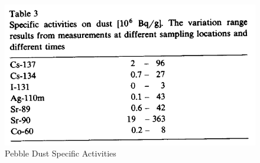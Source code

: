 \begin{figure}[h!]
\centering
\includegraphics[width=0.7\linewidth]{figures/dust-act-tab}
\caption{Pebble Dust Specific Activities \cite{noauthor_results_1990}}
\label{fig:dust-act-tab}
\end{figure}